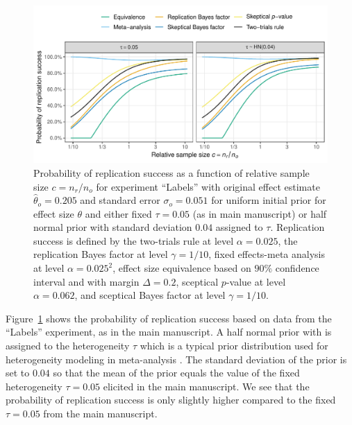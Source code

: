 \begin{subappendices}
\begin{figure}[!htb]
\begin{knitrout}
\color{fgcolor}
\includegraphics[width=\maxwidth]{images/paper3/sup-example-applied-1}
\end{knitrout}
\caption{Probability of replication success as a function of relative sample
  size $c = n_{r}/n_{o}$ for experiment ``Labels'' with original effect estimate
  $\hat{\theta}_{o} = 0.205$ and standard error
  $\sigma_{o} = 0.051$ for uniform initial prior for effect size
  $\theta$ and either fixed $\tau = 0.05$ (as in main
  manuscript) or half normal prior with standard deviation
  $0.04$ assigned to $\tau$. Replication success is defined
  by the two-trials rule at level $\alpha = 0.025$, the replication
  Bayes factor at level $\gamma = 1/10$, fixed effects-meta
  analysis at level $\alpha = 0.025^{2}$, effect size
  equivalence based on $90\%$ confidence interval and with
  margin $\Delta = 0.2$, sceptical $p$-value at level
  $\alpha = 0.062$, and sceptical Bayes factor at level
  $\gamma = 1/10$.}
\label{fig:exampletaurandom}
\end{figure}

Figure~\ref{fig:exampletaurandom} shows the probability of replication success
based on data from the ``Labels'' experiment, as in the main manuscript. A half
normal prior with is assigned to the heterogeneity $\tau$ which is a typical
prior distribution used for heterogeneity modeling in meta-analysis
\citep{Rover2021}. The standard deviation of the prior is set to
$0.04$ so that the mean of the prior equals the value of
the fixed heterogeneity $\tau = 0.05$ elicited in the main manuscript. We see
that the probability of replication success is only slightly higher compared to
the fixed $\tau = 0.05$ from the main manuscript.



\end{subappendices}
